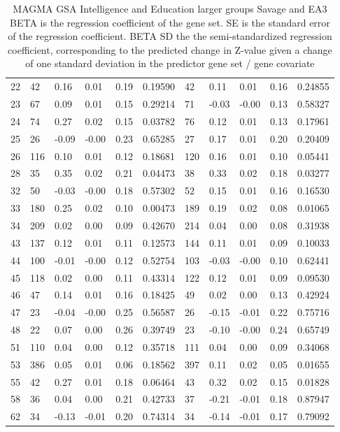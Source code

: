 \begin{table}[ht]
\begin{tabular}{cllllllllll}
  22 & 42 & 0.16 & 0.01 & 0.19 & 0.19590 & 42 & 0.11 & 0.01 & 0.16 & 0.24855 \\ 
  23 & 67 & 0.09 & 0.01 & 0.15 & 0.29214 & 71 & -0.03 & -0.00 & 0.13 & 0.58327 \\ 
  24 & 74 & 0.27 & 0.02 & 0.15 & 0.03782 & 76 & 0.12 & 0.01 & 0.13 & 0.17961 \\ 
  25 & 26 & -0.09 & -0.00 & 0.23 & 0.65285 & 27 & 0.17 & 0.01 & 0.20 & 0.20409 \\ 
  26 & 116 & 0.10 & 0.01 & 0.12 & 0.18681 & 120 & 0.16 & 0.01 & 0.10 & 0.05441 \\ 
  28 & 35 & 0.35 & 0.02 & 0.21 & 0.04473 & 38 & 0.33 & 0.02 & 0.18 & 0.03277 \\ 
  32 & 50 & -0.03 & -0.00 & 0.18 & 0.57302 & 52 & 0.15 & 0.01 & 0.16 & 0.16530 \\ 
  33 & 180 & 0.25 & 0.02 & 0.10 & 0.00473 & 189 & 0.19 & 0.02 & 0.08 & 0.01065 \\ 
  34 & 209 & 0.02 & 0.00 & 0.09 & 0.42670 & 214 & 0.04 & 0.00 & 0.08 & 0.31938 \\ 
  43 & 137 & 0.12 & 0.01 & 0.11 & 0.12573 & 144 & 0.11 & 0.01 & 0.09 & 0.10033 \\ 
  44 & 100 & -0.01 & -0.00 & 0.12 & 0.52754 & 103 & -0.03 & -0.00 & 0.10 & 0.62441 \\ 
  45 & 118 & 0.02 & 0.00 & 0.11 & 0.43314 & 122 & 0.12 & 0.01 & 0.09 & 0.09530 \\ 
  46 & 47 & 0.14 & 0.01 & 0.16 & 0.18425 & 49 & 0.02 & 0.00 & 0.13 & 0.42924 \\ 
  47 & 23 & -0.04 & -0.00 & 0.25 & 0.56587 & 26 & -0.15 & -0.01 & 0.22 & 0.75716 \\ 
  48 & 22 & 0.07 & 0.00 & 0.26 & 0.39749 & 23 & -0.10 & -0.00 & 0.24 & 0.65749 \\ 
  51 & 110 & 0.04 & 0.00 & 0.12 & 0.35718 & 111 & 0.04 & 0.00 & 0.09 & 0.34068 \\ 
  53 & 386 & 0.05 & 0.01 & 0.06 & 0.18562 & 397 & 0.11 & 0.02 & 0.05 & 0.01655 \\ 
  55 & 42 & 0.27 & 0.01 & 0.18 & 0.06464 & 43 & 0.32 & 0.02 & 0.15 & 0.01828 \\ 
  58 & 36 & 0.04 & 0.00 & 0.21 & 0.42733 & 37 & -0.21 & -0.01 & 0.18 & 0.87947 \\ 
  62 & 34 & -0.13 & -0.01 & 0.20 & 0.74314 & 34 & -0.14 & -0.01 & 0.17 & 0.79092 \\ 
   \bottomrule
\end{tabular}

\caption{MAGMA GSA Intelligence and Education larger groups Savage and EA3 BETA is the regression coefficient of the gene set. SE is the standard error of the regression coefficient. BETA SD the the semi-standardized regression coefficient, corresponding to the predicted
change in Z-value given a change of one standard deviation in the predictor gene set / gene covariate } 
\label{tab:MAGMA GSA Intelligence and Education Larger}
\end{table}


